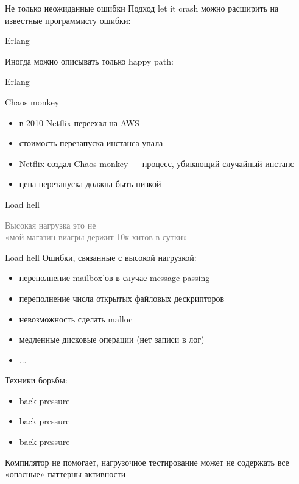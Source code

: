 \documentclass[10pt]{beamer}
\newcommand{\light}[1]{\textcolor{gray}{\footnotesize{#1}}}
\begin{document}
\begin{frame}{Не только неожиданные ошибки}
  Подход let it crash можно расширить на известные программисту ошибки:
  \begin{block}{Erlang}
    \centering
    \small
    \lstset{language=erlang}
    
  \end{block}
  Иногда можно описывать только happy path:
  \begin{block}{Erlang}
    \centering
    \small
    \lstset{language=erlang}
    
  \end{block}

\end{frame}

\begin{frame}{Chaos monkey}
  \begin{itemize}
  \item в 2010 Netflix переехал на AWS
  \item стоимость перезапуска инстанса упала
  \item Netflix создал Chaos monkey — процесс, убивающий случайный инстанс
  \item цена перезапуска должна быть низкой
  \end{itemize}
\end{frame}

\begin{frame}{Load hell}
  \begin{center}
    \light{Высокая нагрузка это не\\«мой магазин виагры держит 10к хитов в сутки»}
  \end{center}
\end{frame}

\begin{frame}{Load hell}
  Ошибки, связанные с высокой нагрузкой:
  \begin{itemize}
  \item переполнение mailbox'ов в случае message passing
  \item переполнение числа открытых файловых дескрипторов
  \item невозможность сделать malloc
  \item медленные дисковые операции (нет записи в лог)
  \item ...
  \end{itemize}
  Техники борьбы:
  \begin{itemize}
  \item back pressure
  \item back pressure
  \item back pressure
  \end{itemize}
  Компилятор не помогает, нагрузочное тестирование может не содержать все «опасные» паттерны активности
\end{frame}
\end{document}

